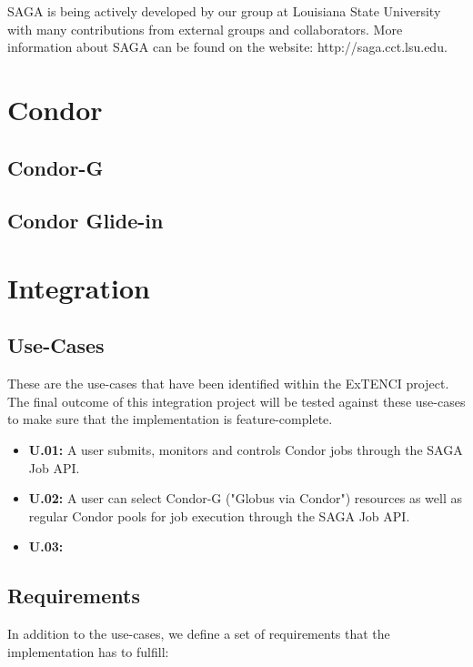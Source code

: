 SAGA is being actively developed by our group at Louisiana State University
with many contributions from external groups and collaborators. More information
about SAGA can be found on the website: http://saga.cct.lsu.edu.


	
	
\section {Condor}
	
\subsection{Condor-G}
	
\subsection{Condor Glide-in}

\section {Integration}

\subsection{Use-Cases}
These are the use-cases that have been identified within the ExTENCI project. The
final outcome of this integration project will be tested against these use-cases
to make sure that the implementation is feature-complete.

\begin{itemize}
\item \textbf{U.01:} A user submits, monitors and controls Condor jobs through
the SAGA Job API.

\item \textbf{U.02:} A user can select Condor-G ("Globus via Condor") resources
as well as regular Condor pools for job execution through the SAGA Job API.

\item \textbf{U.03:}

\end{itemize}

\subsection{Requirements}

In addition to the use-cases, we define a set of requirements that the 
implementation has to fulfill:

